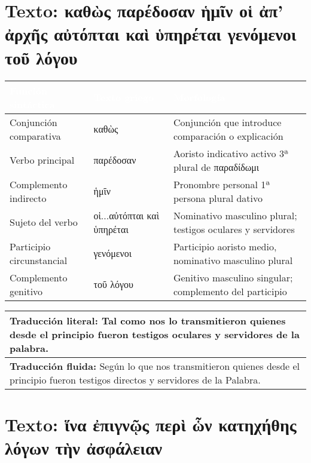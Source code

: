 \documentclass[a4paper,12pt]{article}
\begin{document}

\section{Texto: \textgreek{καθὼς παρέδοσαν ἡμῖν οἱ ἀπ’ ἀρχῆς αὐτόπται καὶ ὑπηρέται γενόμενοι τοῦ λόγου}}

\begin{tabularx}{\textwidth}{|Y|Y|Y|}
\textcolor{white}{\textbf{Función sintáctica}} & \textcolor{white}{\textbf{Texto griego}} & \textcolor{white}{\textbf{Morfología}} \\
\hline
Conjunción comparativa & \textgreek{καθὼς} & Conjunción que introduce comparación o explicación \\
\hline
Verbo principal & \textgreek{παρέδοσαν} & Aoristo indicativo activo 3ª plural de \textgreek{παραδίδωμι} \\
\hline
Complemento indirecto & \textgreek{ἡμῖν} & Pronombre personal 1ª persona plural dativo \\
\hline
Sujeto del verbo & \textgreek{οἱ...αὐτόπται καὶ ὑπηρέται} & Nominativo masculino plural; testigos oculares y servidores \\
\hline
Participio circunstancial & \textgreek{γενόμενοι} & Participio aoristo medio, nominativo masculino plural \\
\hline
Complemento genitivo & \textgreek{τοῦ λόγου} & Genitivo masculino singular; complemento del participio \\
\hline
\end{tabularx}

\vspace{0.5cm}
\begin{tabularx}{\textwidth}{|Y|}
\hline
\textbf{Traducción literal:} Tal como nos lo transmitieron quienes desde el principio fueron testigos oculares y servidores de la palabra. \\
\hline
\textbf{Traducción fluida:} Según lo que nos transmitieron quienes desde el principio fueron testigos directos y servidores de la Palabra. \\
\hline
\end{tabularx}


\section{Texto: \textgreek{ἵνα ἐπιγνῷς περὶ ὧν κατηχήθης λόγων τὴν ἀσφάλειαν}}
\end{document}
